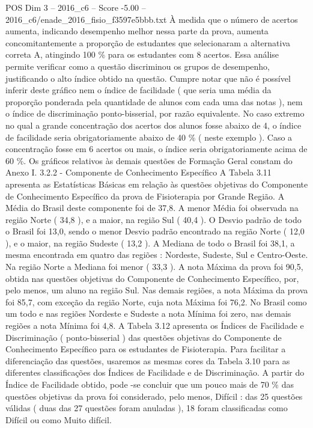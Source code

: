 \begin{textsample}{POS Dim 3 – 2016\_c6 – Score -5.00 – 2016\_c6/enade\_2016\_fisio\_f3597e5bbb.txt}
À medida que o número de acertos aumenta, indicando desempenho melhor nessa parte da prova, aumenta concomitantemente a proporção de estudantes que selecionaram a alternativa correta A, atingindo 100 \% para os estudantes com 8 acertos.
Essa análise permite verificar como a questão discriminou os grupos de desempenho, justificando o alto índice obtido na questão.
Cumpre notar que não é possível inferir deste gráfico nem o índice de facilidade ( que seria uma média da proporção ponderada pela quantidade de alunos com cada uma das notas ), nem o índice de discriminação ponto-bisserial, por razão equivalente.
No caso extremo no qual a grande concentração dos acertos dos alunos fosse abaixo de 4, o índice de facilidade seria obrigatoriamente abaixo de 40 \% ( neste exemplo ).
Caso a concentração fosse em 6 acertos ou mais, o índice seria obrigatoriamente acima de 60 \%.
Os gráficos relativos às demais questões de Formação Geral constam do Anexo I. 3.2.2 - Componente de Conhecimento Específico A Tabela 3.11 apresenta as Estatísticas Básicas em relação às questões objetivas do Componente de Conhecimento Específico da prova de Fisioterapia por Grande Região.
A Média do Brasil deste componente foi de 37,8.
A menor Média foi observada na região Norte ( 34,8 ), e a maior, na região Sul ( 40,4 ).
O Desvio padrão de todo o Brasil foi 13,0, sendo o menor Desvio padrão encontrado na região Norte ( 12,0 ), e o maior, na região Sudeste ( 13,2 ).
A Mediana de todo o Brasil foi 38,1, a mesma encontrada em quatro das regiões : Nordeste, Sudeste, Sul e Centro-Oeste.
Na região Norte a Mediana foi menor ( 33,3 ).
A nota Máxima da prova foi 90,5, obtida nas questões objetivas do Componente de Conhecimento Específico, por, pelo menos, um aluno na região Sul.
Nas demais regiões, a nota Máxima da prova foi 85,7, com exceção da região Norte, cuja nota Máxima foi 76,2.
No Brasil como um todo e nas regiões Nordeste e Sudeste a nota Mínima foi zero, nas demais regiões a nota Mínima foi 4,8.
A Tabela 3.12 apresenta os Índices de Facilidade e Discriminação ( ponto-bisserial ) das questões objetivas do Componente de Conhecimento Específico para os estudantes de Fisioterapia.
Para facilitar a diferenciação das questões, usaremos as mesmas cores da Tabela 3.10 para as diferentes classificações dos Índices de Facilidade e de Discriminação.
A partir do Índice de Facilidade obtido, pode -se concluir que um pouco mais de 70 \% das questões objetivas da prova foi considerado, pelo menos, Difícil : das 25 questões válidas ( duas das 27 questões foram anuladas ), 18 foram classificadas como Difícil ou como Muito difícil.

\end{textsample}
